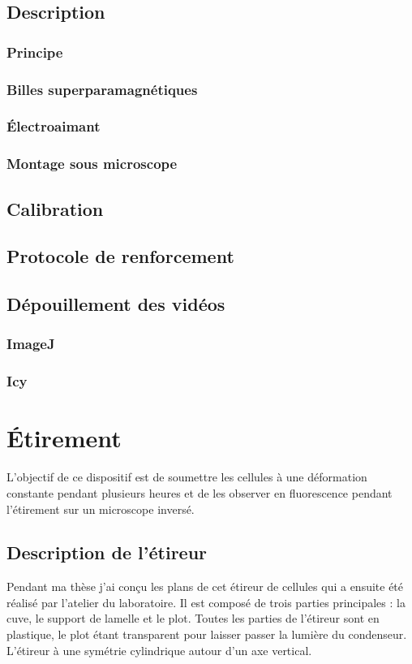 \documentclass{report}
\begin{document}
	\subsection{Description}
		\subsubsection{Principe}
		\subsubsection{Billes superparamagnétiques}
		\subsubsection{\'Electroaimant}
		\subsubsection{Montage sous microscope}
	\subsection{Calibration}
	\subsection{Protocole de renforcement}
	\subsection{Dépouillement des vidéos}
		\subsubsection{ImageJ}
		\subsubsection{Icy}
\section{\'Etirement}
	L'objectif de ce dispositif est de soumettre les cellules à une déformation constante pendant plusieurs heures et de les observer en fluorescence pendant l'étirement sur un microscope inversé. 
	\subsection{Description de l'étireur}
	Pendant ma thèse j'ai conçu les plans de cet étireur de cellules qui a ensuite été réalisé par l'atelier du laboratoire. Il est composé de trois parties principales : la cuve, le support de lamelle et le plot. Toutes les parties de l'étireur sont en plastique, le plot étant transparent pour laisser passer la lumière du condenseur. L'étireur à une symétrie cylindrique autour d'un axe vertical. 
\end{document}
